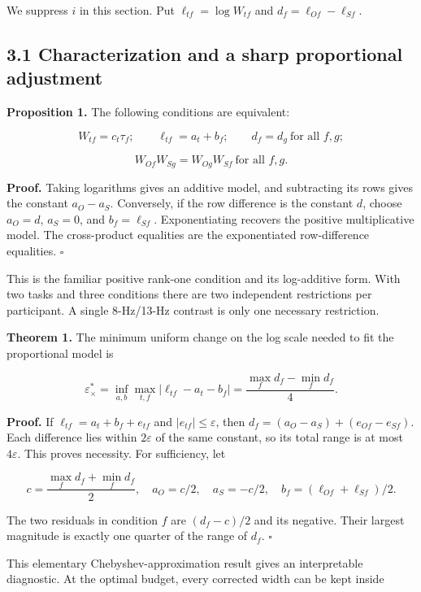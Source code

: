 \documentclass[
  11pt,
]{article}
\let\ctdoldsubsection\subsection
\renewcommand{\subsection}{\Needspace{6\baselineskip}\ctdoldsubsection}
\begin{document}
We suppress \(i\) in this section. Put \(\ell_{tf}=\log W_{tf}\) and
\(d_f=\ell_{Of}-\ell_{Sf}\).

\hypertarget{characterization-and-a-sharp-proportional-adjustment}{%
\subsection{3.1 Characterization and a sharp proportional
adjustment}\label{characterization-and-a-sharp-proportional-adjustment}}

\textbf{Proposition 1.} The following conditions are equivalent:

\[
W_{tf}=c_t\tau_f;\qquad
\ell_{tf}=a_t+b_f;\qquad
d_f=d_g\ \text{for all }f,g;
\]

\[
W_{Of}W_{Sg}=W_{Og}W_{Sf}\ \text{for all }f,g.
\]

\textbf{Proof.} Taking logarithms gives an additive model, and
subtracting its rows gives the constant \(a_O-a_S\). Conversely, if the
row difference is the constant \(d\), choose \(a_O=d\), \(a_S=0\), and
\(b_f=\ell_{Sf}\). Exponentiating recovers the positive multiplicative
model. The cross-product equalities are the exponentiated row-difference
equalities. \(\square\)

This is the familiar positive rank-one condition and its log-additive
form. With two tasks and three conditions there are two independent
restrictions per participant. A single 8-Hz/13-Hz contrast is only one
necessary restriction.

\textbf{Theorem 1.} The minimum uniform change on the log scale needed
to fit the proportional model is

\[
\varepsilon_\times^*
=\inf_{a,b}\max_{t,f}|\ell_{tf}-a_t-b_f|
=\frac{\max_f d_f-\min_f d_f}{4}.
\]

\textbf{Proof.} If \(\ell_{tf}=a_t+b_f+e_{tf}\) and
\(|e_{tf}|\leq\varepsilon\), then \(d_f=(a_O-a_S)+(e_{Of}-e_{Sf})\).
Each difference lies within \(2\varepsilon\) of the same constant, so
its total range is at most \(4\varepsilon\). This proves necessity. For
sufficiency, let

\[
c=\frac{\max_f d_f+\min_f d_f}{2},\quad
a_O=c/2,\quad a_S=-c/2,\quad
b_f=(\ell_{Of}+\ell_{Sf})/2.
\]

The two residuals in condition \(f\) are \((d_f-c)/2\) and its negative.
Their largest magnitude is exactly one quarter of the range of \(d_f\).
\(\square\)

This elementary Chebyshev-approximation result gives an interpretable
diagnostic. At the optimal budget, every corrected width can be kept
inside
\end{document}
